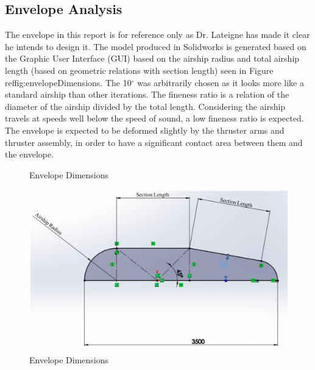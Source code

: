 \documentclass[../main.tex]{subfiles}
\begin{document}
	
\subsection{Envelope Analysis} \label{envelopeAnalysis}
The envelope in this report is for reference only as Dr. Lateigne has made it clear he intends to design it. The model produced in Solidworks is generated based on the Graphic User Interface (GUI) based on the airship radius and total airship length (based on geometric relations with section length) seen in Figure ref{fig:envelopeDimensions}. The 10$^{\circ}$ was arbitrarily chosen as it looks more like a standard airship than other iterations. The fineness ratio is a relation of the diameter of the airship divided by the total length. Considering the airship travels at speeds well below the speed of sound, a low fineness ratio is expected. The envelope is expected to be deformed slightly by the thruster arms and thruster assembly, in order to have a significant contact area between them and the envelope.

	\begin{figure}[H]
	\centering
	\caption{Envelope Dimensions}
	\includegraphics[width=.7\linewidth]{img/design/envelopeDimensions.png}
	\caption{Envelope Dimensions}
	\label{fig:envelopeDimensions}
\end{figure}
\end{document}
